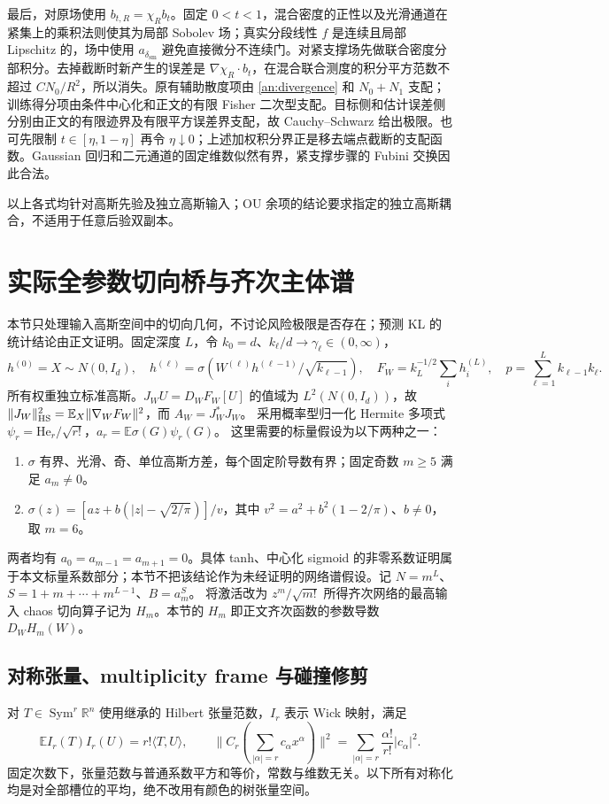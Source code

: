 \documentclass[a4paper]{tufte-handout}
\newcommand{\dsm}{\delta_{\mathrm{sm}}}
\begin{document}
\begin{fullwidth}
最后，对原场使用 $b_{t,R}=\chi_R b_t$。固定 $0<t<1$，混合密度的正性以及光滑通道在紧集上的乘积法则使其为局部 Sobolev 场；真实分段线性 $f$ 是连续且局部 Lipschitz 的，场中使用 $a_{\dsm}$ 避免直接微分不连续门。对紧支撑场先做联合密度分部积分。去掉截断时新产生的误差是 $\nabla\chi_R\cdot b_t$，在混合联合测度的积分平方范数不超过 $C N_0/R^2$，所以消失。原有辅助散度项由 \eqref{an:divergence} 和 $N_0+N_1$ 支配；训练得分项由条件中心化和正文的有限 Fisher 二次型支配。目标侧和估计误差侧分别由正文的有限迹界及有限平方误差界支配，故 Cauchy--Schwarz 给出极限。也可先限制 $t\in[\eta,1-\eta]$ 再令 $\eta\downarrow0$；上述加权积分界正是移去端点截断的支配函数。Gaussian 回归和二元通道的固定维数似然有界，紧支撑步骤的 Fubini 交换因此合法。

以上各式均针对高斯先验及独立高斯输入；OU 余项的结论要求指定的独立高斯耦合，不适用于任意后验双副本。

\section{实际全参数切向桥与齐次主体谱}\label{tg:section}\label{app:bridge}
本节只处理输入高斯空间中的切向几何，不讨论风险极限是否存在；预测 KL 的统计结论由正文证明。固定深度 $L$，令 $k_0=d$、$k_\ell/d\to\gamma_\ell\in(0,\infty)$，
\[
 h^{(0)}=X\sim N(0,I_d),\quad h^{(\ell)}=\sigma(W^{(\ell)} h^{(\ell-1)}/\sqrt{k_{\ell-1}}),\quad
 F_W=k_L^{-1/2}\sum_i h_i^{(L)},\quad p=\sum_{\ell=1}^Lk_{\ell-1}k_\ell.
\]
所有权重独立标准高斯。$J_WU=D_WF_W[U]$ 的值域为 $L^2(N(0,I_d))$，故
$\|J_W\|_{\rm HS}^2=\mathbb E_X\|\nabla_WF_W\|^2$，而 $A_W=J_W^*J_W$。
采用概率型归一化 Hermite 多项式 $\psi_r=\mathrm{He}_r/\sqrt{r!}$，$a_r=\mathbb E\sigma(G)\psi_r(G)$。
这里需要的标量假设为以下两种之一：
\begin{enumerate}
\item $\sigma$ 有界、光滑、奇、单位高斯方差，每个固定阶导数有界；固定奇数 $m\ge5$ 满足 $a_m\ne0$。
\item $\sigma(z)=[az+b(|z|-\sqrt{2/\pi})]/v$，其中 $v^2=a^2+b^2(1-2/\pi)$、$b\ne0$，取 $m=6$。
\end{enumerate}
两者均有 $a_0=a_{m-1}=a_{m+1}=0$。具体 tanh、中心化 sigmoid 的非零系数证明属于本文标量系数部分；本节不把该结论作为未经证明的网络谱假设。记
$N=m^L$、$S=1+m+\cdots+m^{L-1}$、$B=a_m^S$。
将激活改为 $z^m/\sqrt{m!}$ 所得齐次网络的最高输入 chaos 切向算子记为 $H_m$。本节的 $H_m$ 即正文齐次函数的参数导数 $D_WH_m(W)$。

\subsection{对称张量、multiplicity frame 与碰撞修剪}
对 $T\in\operatorname{Sym}^r\mathbb R^n$ 使用继承的 Hilbert 张量范数，$I_r$ 表示 Wick 映射，满足
\[
 \mathbb E I_r(T)I_r(U)=r!\langle T,U\rangle,\qquad
 \|C_r(\textstyle\sum_{|\alpha|=r}c_\alpha x^\alpha)\|^2
 =\sum_{|\alpha|=r}\frac{\alpha!}{r!}|c_\alpha|^2.\tag{TG.1}
\]
固定次数下，张量范数与普通系数平方和等价，常数与维数无关。以下所有对称化均是对全部槽位的平均，绝不改用有颜色的树张量空间。


\end{fullwidth}
\end{document}

